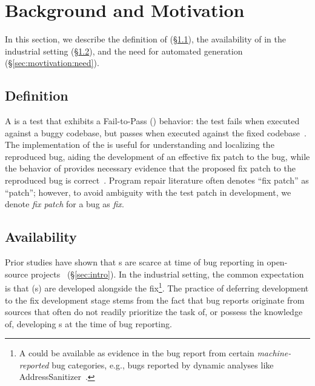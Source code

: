 \section{Background and Motivation}
\label{sec:motivation}
 
In this section, we describe the definition of \brt (\S\ref{sec:movtivation:def}), the availability of \brt in the industrial setting (\S\ref{sec:movtivation:available}), and the need for automated \brt generation (\S\ref{sec:movtivation:need}).

\subsection{\brt Definition}
\label{sec:movtivation:def}

A \brt is a test that exhibits a Fail-to-Pass (\failtopass) behavior: the test fails when executed against a buggy codebase, but passes when executed against the fixed codebase~\cite{mundler2024swt}. 
The implementation of the \brt is useful for understanding and localizing the reproduced bug, aiding the development of an effective fix patch to the bug, while the \failtopass behavior of \brt provides necessary evidence that the proposed fix patch to the reproduced bug is correct~\cite{ko2008debugging,kang2023large,mundler2024swt,yang2024swe,nayrolles2015jcharming,rondon2025passerine,Ernst2014Defects4J,saha2017elixir,koyuncu2019ifixr,le2012systematic}. 
Program repair literature often denotes ``fix patch'' as ``patch''; however, to avoid ambiguity with the test patch in \brt development, we denote \textit{fix patch} for a bug as \textit{fix}.


\subsection{\brt Availability}
\label{sec:movtivation:available}

Prior studies have shown that \brt{}s are scarce at time of bug reporting in open-source projects~\cite{koyuncu2019ifixr, mundler2024swt} (\S\ref{sec:intro}).
In the industrial setting, the common expectation is that \brt{}(s) are developed alongside the fix\footnote{A \brt could be available as evidence in the bug report from certain \textit{machine-reported} bug categories, e.g., bugs reported by dynamic analyses like AddressSanitizer~\cite{addresssanitizer}.}.
The practice of deferring \brt development to the fix development stage stems from the fact that bug reports originate from sources that often do not readily prioritize the task of, or possess the knowledge of, developing \brt{}s at the time of bug reporting. 

